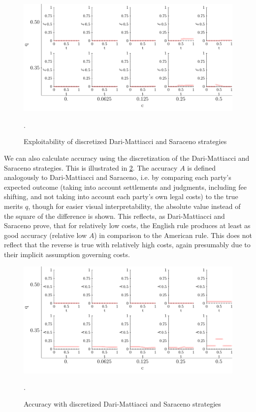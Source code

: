 \documentclass{article}
\begin{document}
\begin{figure}[h!]
\centering
\includegraphics[scale=0.60, trim={0in 0in 0in 0in}, clip]{../Figures/DMS formulas exploitability.pdf}
\caption{Exploitability of discretized Dari-Mattiacci and Saraceno strategies}. 
\label{fig:exploit}
\end{figure}

We can also calculate accuracy using the discretization of the Dari-Mattiacci and Saraceno strategies. This is illustrated in \ref{fig:dmsaccuracy}. The accuracy $A$ is defined analogously to Dari-Mattiacci and Saraceno, i.e. by comparing each party's expected outcome (taking into account settlements and judgments, including fee shifting, and not taking into account each party's own legal costs) to the true merits $q$, though for easier visual interpretability, the absolute value instead of the square of the difference is shown. This reflects, as Dari-Mattiacci and Saraceno prove, that for relatively low costs, the English rule produces at least as good accuracy (relative low $A$) in comparison to the American rule. This does not reflect that the reverse is true with relatively high costs, again presumably due to their implicit assumption governing costs.

\begin{figure}[h!]
\centering
\includegraphics[scale=0.60, trim={0in 0in 0in 0in}, clip]{../Figures/DMS formulas accuracy.pdf}
\caption{Accuracy with discretized Dari-Mattiacci and Saraceno strategies}. 
\label{fig:dmsaccuracy}
\end{figure}
\end{document}
